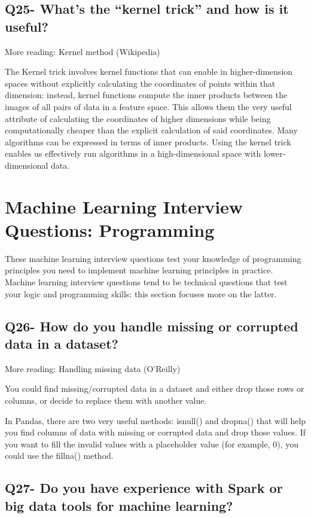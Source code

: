 \documentclass[11pt,a4paper]{article}
\begin{document}
\subsection{Q25- What’s the “kernel trick” and how is it useful?}

More reading: Kernel method (Wikipedia)

The Kernel trick involves kernel functions that can enable in higher-dimension spaces without explicitly calculating the coordinates of points within that dimension: instead, kernel functions compute the inner products between the images of all pairs of data in a feature space. This allows them the very useful attribute of calculating the coordinates of higher dimensions while being computationally cheaper than the explicit calculation of said coordinates. Many algorithms can be expressed in terms of inner products. Using the kernel trick enables us effectively run  algorithms in a high-dimensional space with lower-dimensional data.





\section{Machine Learning Interview Questions: Programming}
These machine learning interview questions test your knowledge of programming principles you need to implement machine learning principles in practice. Machine learning interview questions tend to be technical questions that test your logic and programming skills: this section focuses more on the latter.

\subsection{Q26- How do you handle missing or corrupted data in a dataset?}

More reading: Handling missing data (O’Reilly)

You could find missing/corrupted data in a dataset and either drop those rows or columns, or decide to replace them with another value.

In Pandas, there are two very useful methods: isnull() and dropna() that will help you find columns of data with missing or corrupted data and drop those values. If you want to fill the invalid values with a placeholder value (for example, 0), you could use the fillna() method.

\subsection{Q27- Do you have experience with Spark or big data tools for machine learning?}
\end{document}
